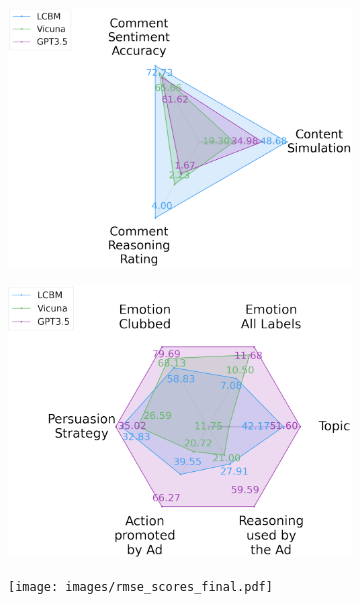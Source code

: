 \begin{figure}[!t]
{{\begin{subfigure}[b]{0.4\textwidth}
    \includegraphics[width=1.15\textwidth]{images/content_simulation_2.png}
    \caption{}
\end{subfigure}
\begin{subfigure}[b]{0.4\textwidth}
    \includegraphics[width=1.15\textwidth]{images/understanding_2.png}
    \caption{}
\end{subfigure}
\iffalse
\begin{subfigure}[b]{0.25\textwidth}
\texttt{[image: images/rmse\_scores\_final.pdf]}\caption{}    
\end{subfigure}
\begin{subfigure}[b]{0.25\textwidth}

\end{subfigure}}}
\end{figure}
